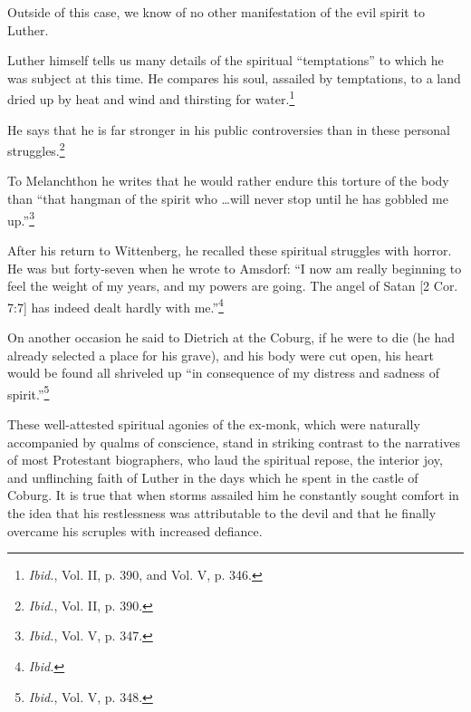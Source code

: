 Outside of this
case, we know of no other manifestation of the evil spirit to Luther.

Luther himself tells us many details of the spiritual “temptations”
to which he was subject at this time. He compares his soul, assailed
by temptations, to a land dried up by heat and wind and thirsting for
water.\footnote{\textit{Ibid.}, Vol. II, p. 390, and Vol. V, p. 346.}

He says that he is far stronger in his public controversies than
in these personal struggles.\footnote{\textit{Ibid.}, Vol. II, p. 390.}

To Melanchthon he writes that he would
rather endure this torture of the body than “that hangman of the
spirit who \dots will never stop until he has gobbled me up.”\footnote{\textit{Ibid.}, Vol. V, p. 347.}

After
his return to Wittenberg, he recalled these spiritual struggles with
horror. He was but forty-seven when he wrote to Amsdorf: “I now
am really beginning to feel the weight of my years, and my powers
are going. The angel of Satan [2 Cor. 7:7] has indeed dealt hardly
with me.”\footnote{\textit{Ibid.}}

On another occasion he said to Dietrich at the Coburg,
if he were to die (he had already selected a place for his grave),
and his body were cut open, his heart would be found all shriveled
up “in consequence of my distress and sadness of spirit.”\footnote{\textit{Ibid.}, Vol. V, p. 348.}

These well-attested spiritual agonies of the ex-monk, which were
naturally accompanied by qualms of conscience, stand in striking
contrast to the narratives of most Protestant biographers, who laud
the spiritual repose, the interior joy, and unflinching faith of Luther
in the days which he spent in the castle of Coburg. It is true that when
storms assailed him he constantly sought comfort in the idea that his
restlessness was attributable to the devil and that he finally overcame
his scruples with increased defiance.

